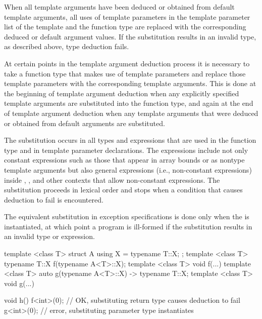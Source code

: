 When all template arguments have been deduced or obtained from
default template arguments, all uses of template parameters in
the template parameter list of the template and the function type
are replaced with the corresponding deduced
or default argument values. If the substitution results in an
invalid type, as described above, type deduction fails.

\pnum
At certain points in the template argument deduction process it is necessary
to take a function type that makes use of template parameters and replace those
template parameters with the corresponding template arguments. This is done at
the beginning of template argument deduction when any explicitly specified
template arguments are substituted into the function type, and again at the end
of template argument deduction when any template arguments that were deduced or
obtained from default arguments are substituted.

\pnum
The substitution occurs in all types and expressions that are used in the function
type and in template parameter declarations. The expressions include not only
constant expressions such as those that appear in array bounds or as nontype
template arguments but also general expressions (i.e., non-constant expressions)
inside , , and other contexts that allow non-constant
expressions. The substitution proceeds in lexical order and stops when
a condition that causes deduction to fail is encountered. \begin{note} The equivalent substitution in exception specifications is
done only when the  is instantiated, at which point a program is ill-formed
if the substitution results in an invalid type or
expression. \end{note}
\begin{example}
\begin{codeblock}
template <class T> struct A { using X = typename T::X; };
template <class T> typename T::X f(typename A<T>::X);
template <class T> void f(...) { }
template <class T> auto g(typename A<T>::X) -> typename T::X;
template <class T> void g(...) { }

void h() {
  f<int>(0); // OK, substituting return type causes deduction to fail
  g<int>(0); // error, substituting parameter type instantiates 
}
\end{codeblock}
\end{example}

